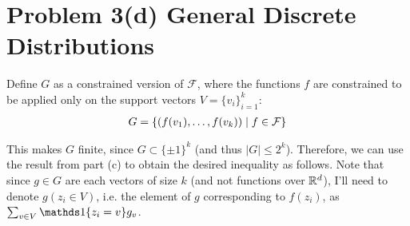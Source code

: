 \documentclass[11pt]{article}
\newcommand{\1}{\mathbb{I}} %
\begin{document}
\begin{comment}
Similar to 3(b), we can prove this using moment generating functions. 
\begin{align}
	\exp\lr{ \lambda R_S(G)  }
		&= \exp\lr{ \lambda  \E[\sigma]{ \sup_{g \in G}  \inv{n} \insum \sigma_i g(z_i) } } \\
		&\leq \E[\sigma]{   \exp\lr{ \lambda  \sup_{g \in G}  \inv{n} \insum \sigma_i g(z_i) }  } \qquad \mtgreen{[Jensen's Ineq.]} \\
		&= \E[\sigma]{  \sup_{g \in G}  \exp\lr{ \frac{\lambda}{n} \insum \sigma_i g(z_i) } }    \qquad 
			\mgreen{[ e^{\max \cdot } = \max e^{\cdot} ]} \\
		&\leq \sum_{g \in G} \E[\sigma]{  \exp\lr{ \frac{\lambda}{n} \insum \sigma_i g(z_i) }   } 
			\qquad \mtgreen{[finite G, exp non-negative]} \\
		&= \sum_{g \in G} \prod_{i=1}^{n} \E[\sigma_i]{ \exp\lr{    \frac{\lambda}{n}  \sigma_i g(z_i)} }
\end{align}

Next, we note that 
\begin{align}
	\E[\sigma_i]{ \exp \lr{ \lambda \sigma_i x } } 
		&= \onehalf \lr{ \exp\lr{  \lambda x }  +  \exp\lr{  - \lambda x }       } \\
		&= \cosh(\lambda x )
\end{align}

\red{ASK: how to utilize part (b) for this...?}
\end{comment}


\clearpage 
\section*{Problem 3(d) General Discrete Distributions}

Define $G$ as a constrained version of $\mathcal F$, where the functions  $f$ are constrained to be applied only on the support vectors $V = \{ v_i \}_{i=1}^k$:
\begin{align}
	G = \{ \left(   f(v_1), \ldots, f(v_k)  \right)  \mid f \in \mathcal F  \}
\end{align}


This makes $G$ finite, since $G \subset \{ \pm 1 \}^{k}$ (and thus $|G| \leq 2^k$). Therefore, we can use the result from part (c) to obtain the desired inequality as follows. Note that since $g \in G$ are each vectors of size $k$ (and not functions over $\mathbb{R}^d$), I'll need to denote $g(z_i \in V)$, i.e. the element of $g$ corresponding to $f(z_i)$, as $ \sum_{v \in V}  \ind\{  z_i = v  \} g_v   $. 
\end{document}

